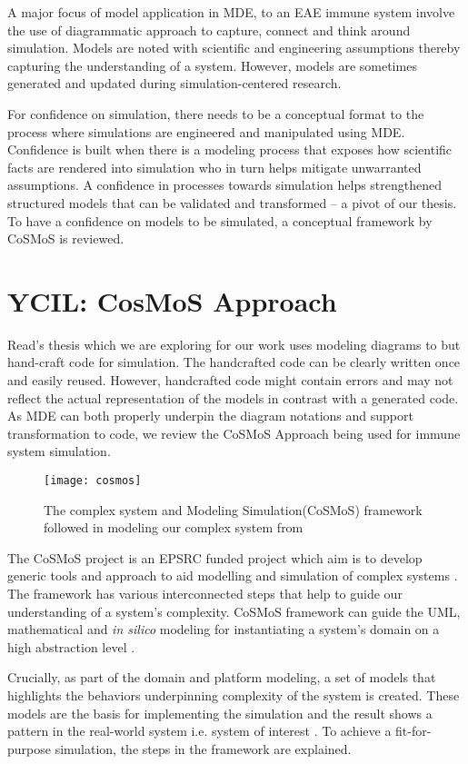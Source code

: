 \documentclass[12pt, a4paper]{report}
\begin{document}
A major focus of model application in MDE, to an EAE immune system involve the use of diagrammatic approach to capture, connect and think around simulation. Models are noted with scientific and engineering assumptions thereby capturing the understanding of a system. However, models are sometimes generated and updated during simulation-centered research.  

For confidence on simulation, there needs to be a conceptual format to the process where simulations are engineered and manipulated using MDE. Confidence is built when there is a modeling process that exposes how scientific facts are rendered into simulation who in turn helps mitigate unwarranted assumptions. A confidence in processes towards simulation helps strengthened structured models that can be validated and transformed – a pivot of our thesis. To have a confidence on models to be simulated, a conceptual framework by CoSMoS is reviewed.
  
\section{YCIL: CosMoS Approach}
Read's thesis \cite{Read2011} which we are exploring for our work uses modeling diagrams to but hand-craft code for simulation. The handcrafted code can be clearly written once and easily reused. However, handcrafted code might contain errors and may not reflect the actual representation of the models in contrast with a generated code. As MDE can both properly underpin the diagram notations and support transformation to code, we review the CoSMoS Approach being used for immune system simulation.

\begin{figure}[!ht]
  \centering
   \texttt{[image: cosmos]}
  \caption{The complex system and Modeling Simulation(CoSMoS) framework followed in modeling our complex system from \cite{Software}}
  \label{fig:mrad}
\end{figure}

The CoSMoS project is an EPSRC funded project which aim is to develop generic tools and approach to aid modelling and simulation of complex systems \cite{cosmos2011-process}. The framework has various interconnected steps that help to guide our understanding of a system’s complexity. CoSMoS framework can guide the UML, mathematical and \textit{in silico} modeling for instantiating a system's domain on a high abstraction level \cite{Software}.

Crucially, as part of the domain and platform modeling, a set of models that highlights the behaviors underpinning complexity of the system is created. These models are the basis for implementing the simulation and the result shows a pattern in the real-world system i.e. system of interest \cite{cosmos:tech-report}. To achieve a fit-for-purpose simulation, the steps in the framework are explained. 
\end{document}
